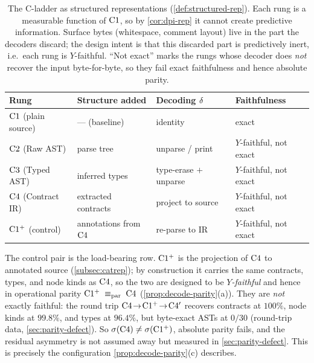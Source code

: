 \begin{table}[t]
\centering
\small
\begin{tabular}{@{}llll@{}}
\toprule
Rung & Structure added & Decoding $\delta$ & Faithfulness \\
\midrule
$\mathrm{C}1$ (plain source) & --- (baseline)        & identity            & exact \\
$\mathrm{C}2$ (Raw AST)      & parse tree            & unparse / print     & $Y$-faithful, not exact \\
$\mathrm{C}3$ (Typed AST)    & inferred types        & type-erase $+$ unparse & $Y$-faithful, not exact \\
$\mathrm{C}4$ (Contract IR)  & extracted contracts   & project to source   & $Y$-faithful, not exact \\
$\mathrm{C1^{+}}$ (control)     & annotations from $\mathrm{C}4$ & re-parse to IR & $Y$-faithful, not exact \\
\bottomrule
\end{tabular}
\caption{The C-ladder as structured representations (\cref{def:structured-rep}).
Each rung is a measurable function of $\mathrm{C}1$, so by \cref{cor:dpi-rep} it
cannot create predictive information. Surface bytes (whitespace, comment
layout) live in the part the decoders discard; the design intent is that this
discarded part is predictively inert, i.e.\ each rung is $Y$-faithful. ``Not
exact'' marks the rungs whose decoder does \emph{not} recover the input
byte-for-byte, so they fail exact faithfulness and hence absolute parity.}
\label{tab:cladder}
\end{table}

The control pair is the load-bearing row. $\mathrm{C1^{+}}$ is the projection of
$\mathrm{C}4$ to annotated source (\cref{subsec:catrep}); by construction it
carries the same contracts, types, and node kinds as $\mathrm{C}4$, so the two
are designed to be \emph{$Y$-faithful} and hence in operational parity
$\mathrm{C1^{+}}\;\equiv_{\mathrm{par}}\;\mathrm{C}4$ (\cref{prop:decode-parity}(a)). They are
\emph{not} exactly faithful: the round trip
$\mathrm{C}4 \!\to\! \mathrm{C1^{+}} \!\to\! \mathrm{C}4'$ recovers contracts at $100\%$, node kinds
at $99.8\%$, and types at $96.4\%$, but byte-exact ASTs at $0/30$
(round-trip data, \cref{sec:parity-defect}). So $\sigma\!\left(\mathrm{C}4\right)\ne
\sigma\!\left(\mathrm{C1^{+}}\right)$, absolute parity fails, and the residual asymmetry is not
assumed away but measured in \cref{sec:parity-defect}. This is precisely the
configuration \cref{prop:decode-parity}(c) describes.

